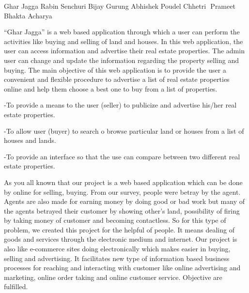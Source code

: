  \begin{conf-abstract}[]
 {Ghar Jagga }
 { Rabin Senchuri
 	Bijay Gurung
 	Abhishek Poudel Chhetri  
 	Prameet Bhakta Acharya
 }
{}

 “Ghar Jagga” is a web based application through which a user can perform the activities like buying and selling of land and houses. In this web application, the user can access information and advertise their real estate properties. The admin user can change and update the information regarding the property selling and buying. The main objective of this web application is to provide the user a convenient and flexible procedure to advertise a list of real estate properties online and help them choose a best one to buy from a list of properties.
 
 -To provide a means to the user (seller) to publicize and advertise his/her real estate properties.
 
 -To allow user (buyer) to search o browse particular land or houses from a list of houses and lands.
 
 -To provide an interface so that the use can compare between two different real estate properties.
 
 As you all known that our project is a web based application which can be done by online for selling, buying. From our survey, people were betray by the agent. Agents are also made for earning money by doing good or bad work but many of the agents betrayed their customer by showing other’s land, possibility of firing by taking money of customer and becoming contactless. So for this type of problem, we created this project for the helpful of people. It means dealing of goods and services through the electronic medium and internet. Our project is also like e-commerce sites doing electronically which makes easier in buying, selling and advertising. It facilitates new type of information based business processes for reaching and interacting with customer like online advertising and marketing, online order taking and online customer service. Objective are fulfilled.
 
\end{conf-abstract}